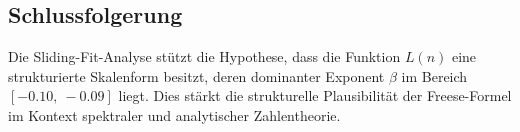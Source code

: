 \subsection*{Schlussfolgerung}

Die Sliding-Fit-Analyse stützt die Hypothese, dass die Funktion $L(n)$ eine strukturierte Skalenform besitzt, deren dominanter Exponent $\beta$ im Bereich $[-0.10,\ -0.09]$ liegt. Dies stärkt die strukturelle Plausibilität der Freese-Formel im Kontext spektraler und analytischer Zahlentheorie.